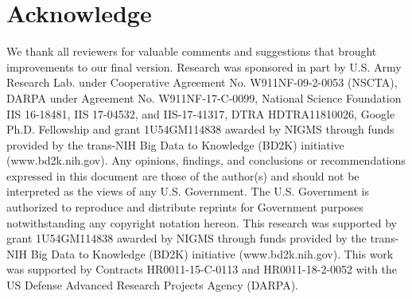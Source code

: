 \documentclass[11pt,a4paper]{article}
\begin{document}
\section*{Acknowledge}
We thank all reviewers for valuable comments and suggestions that brought improvements to our final version.
Research was sponsored in part by U.S. Army Research Lab. under Cooperative Agreement No. W911NF-09-2-0053 (NSCTA), DARPA under Agreement No. W911NF-17-C-0099, National Science Foundation IIS 16-18481, IIS 17-04532, and IIS-17-41317, DTRA HDTRA11810026,  Google Ph.D. Fellowship and grant 1U54GM114838 awarded by NIGMS through funds provided by the trans-NIH Big Data to Knowledge (BD2K) initiative (www.bd2k.nih.gov). Any opinions, findings, and conclusions or recommendations expressed in this document are those of the author(s) and should not be interpreted as the views of any U.S. Government. The U.S. Government is authorized to reproduce and distribute reprints for Government purposes notwithstanding any copyright notation hereon.
This research was supported by grant 1U54GM114838 awarded by NIGMS through funds provided by the trans-NIH Big Data to Knowledge (BD2K) initiative (www.bd2k.nih.gov). This work was supported by Contracts HR0011-15-C-0113 and HR0011-18-2-0052 with the US Defense Advanced Research Projects Agency (DARPA).




\end{document}
